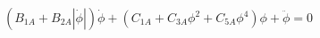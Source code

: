 \begin{equation} \label{eq:roll_decay_equation_quadratic_A}
\left(B_{1A} + B_{2A} \left|{\dot{\phi}}\right|\right) \dot{\phi} + \left(C_{1A} + C_{3A} \phi^{2} + C_{5A} \phi^{4}\right) \phi + \ddot{\phi} = 0
\end{equation}
